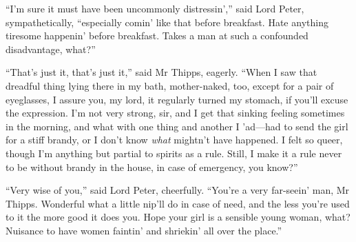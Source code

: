 \enquote{I’m sure it must have been uncommonly distressin’,} said Lord Peter, sympathetically, \enquote{especially comin’ like that before breakfast. Hate anything tiresome happenin’ before breakfast. Takes a man at such a confounded disadvantage, what?}

\enquote{That’s just it, that’s just it,} said Mr Thipps, eagerly. \enquote{When I saw that dreadful thing lying there in my bath, mother-naked, too, except for a pair of eyeglasses, I assure you, my lord, it regularly turned my stomach, if you’ll excuse the expression. I’m not very strong, sir, and I get that sinking feeling sometimes in the morning, and what with one thing and another I ’ad\allowbreak---\allowbreak had to send the girl for a stiff brandy, or I don’t know \textit{what} mightn’t have happened. I felt so queer, though I’m anything but partial to spirits as a rule. Still, I make it a rule never to be without brandy in the house, in case of emergency, you know?}

\enquote{Very wise of you,} said Lord Peter, cheerfully. \enquote{You’re a very far-seein’ man, Mr Thipps. Wonderful what a little nip’ll do in case of need, and the less you’re used to it the more good it does you. Hope your girl is a sensible young woman, what? Nuisance to have women faintin’ and shriekin’ all over the place.}

